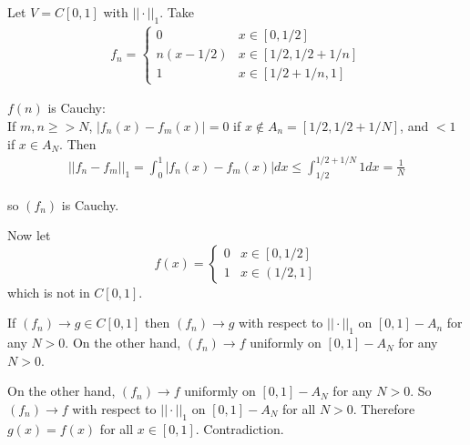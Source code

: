 \documentclass[a4paper]{article}
\begin{document}
\begin{eg}
Let $V=C\left[0,1\right]$ with $||\cdot||_1$. Take
\begin{equation*}
\begin{aligned}
f_n = \left\{\begin{array}{ll}
0 & x\in\left[0,1/2\right]\\
n\left(x-1/2\right) & x\in\left[1/2,1/2+1/n\right]\\
1 & x \in \left[1/2+1/n,1\right]
\end{array}
\right.
\end{aligned}
\end{equation*}


$f\left(n\right)$ is Cauchy:\\
If $m,n \geq >N$, $|f_n\left(x\right) - f_m\left(x\right)| = 0$ if $x \not\in A_n = \left[1/2,1/2+1/N\right]$, and $<1$ if $x \in A_N$. Then
\begin{equation*}
\begin{aligned}
||f_n - f_m||_1 = \int_0^1 |f_n\left(x\right) - f_m\left(x\right)| dx \leq \int_{1/2}^{1/2+1/N} 1 dx = \frac{1}{N}
\end{aligned}
\end{equation*}

so $\left(f_n\right)$ is Cauchy.

Now let $$f\left(x\right) = \left\{\begin{array}{ll}
0 & x\in\left[0,1/2\right]\\
1 & x\in\left(1/2,1\right]
\end{array}
\right.$$
which is not in $C\left[0,1\right]$.

If $\left(f_n\right) \to g \in C\left[0,1\right]$ then $\left(f_n\right) \to g$ with respect to $||\cdot||_1$ on $\left[0,1\right] - A_n$ for any $N>0$. On the other hand, $\left(f_n\right) \to f$ uniformly on $\left[0,1\right]-A_N$ for any $N>0$.

On the other hand, $\left(f_n\right) \to f$ uniformly on $\left[0,1\right] - A_N$ for any $N>0$. So $\left(f_n\right) \to f$ with respect to $||\cdot||_1$ on $\left[0,1\right]-A_N$ for all $N>0$. Therefore $g\left(x\right) = f\left(x\right)$ for all $x \in \left[0,1\right]$. Contradiction.
\end{eg}
\end{document}
